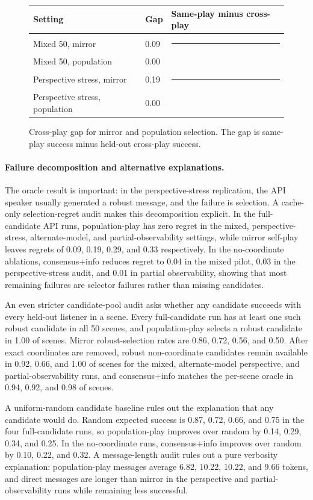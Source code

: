 \documentclass[10pt]{article}
\begin{document}
\begin{figure}[H]
\centering
\begin{tabular}{lll}
\toprule
Setting & Gap & Same-play minus cross-play \\
\midrule
Mixed 50, mirror & 0.09 & \rule{0.93cm}{6pt} \\
Mixed 50, population & 0.00 &  \\
Perspective stress, mirror & 0.19 & \rule{1.87cm}{6pt} \\
Perspective stress, population & 0.00 &  \\
\bottomrule
\end{tabular}
\caption{Cross-play gap for mirror and population selection. The gap is same-play success minus held-out cross-play success.}
\label{fig:gaps}
\end{figure}

\paragraph{Failure decomposition and alternative explanations.}
The oracle result is important: in the perspective-stress replication, the API speaker usually generated a robust message, and the failure is selection. A cache-only selection-regret audit makes this decomposition explicit. In the full-candidate API runs, population-play has zero regret in the mixed, perspective-stress, alternate-model, and partial-observability settings, while mirror self-play leaves regrets of 0.09, 0.19, 0.29, and 0.33 respectively. In the no-coordinate ablations, consensus+info reduces regret to 0.04 in the mixed pilot, 0.03 in the perspective-stress audit, and 0.01 in partial observability, showing that most remaining failures are selector failures rather than missing candidates.

An even stricter candidate-pool audit asks whether any candidate succeeds with every held-out listener in a scene. Every full-candidate run has at least one such robust candidate in all 50 scenes, and population-play selects a robust candidate in 1.00 of scenes. Mirror robust-selection rates are 0.86, 0.72, 0.56, and 0.50. After exact coordinates are removed, robust non-coordinate candidates remain available in 0.92, 0.66, and 1.00 of scenes for the mixed, alternate-model perspective, and partial-observability runs, and consensus+info matches the per-scene oracle in 0.94, 0.92, and 0.98 of scenes.

A uniform-random candidate baseline rules out the explanation that any candidate would do. Random expected success is 0.87, 0.72, 0.66, and 0.75 in the four full-candidate runs, so population-play improves over random by 0.14, 0.29, 0.34, and 0.25. In the no-coordinate runs, consensus+info improves over random by 0.10, 0.22, and 0.32. A message-length audit rules out a pure verbosity explanation: population-play messages average 6.82, 10.22, 10.22, and 9.66 tokens, and direct messages are longer than mirror in the perspective and partial-observability runs while remaining less successful.
\end{document}
